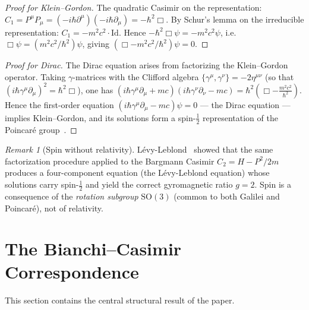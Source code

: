 \documentclass[12pt]{article}
\theoremstyle{plain}
\theoremstyle{definition}
\theoremstyle{remark}
\newtheorem{remark}[theorem]{Remark}
\newcommand{\SO}{\mathrm{SO}}
\begin{document}
\begin{proof}[Proof for Klein--Gordon]
The quadratic Casimir on the representation: $C_1 = P^\mu P_\mu = (-i\hbar\partial^\mu)(-i\hbar\partial_\mu) = -\hbar^2\Box$. By Schur's lemma on the irreducible representation: $C_1 = -m^2c^2 \cdot \mathrm{Id}$. Hence $-\hbar^2\Box\psi = -m^2c^2\psi$, i.e.\ $\Box\psi = (m^2c^2/\hbar^2)\psi$, giving $(\Box - m^2c^2/\hbar^2)\psi = 0$.
\end{proof}

\begin{proof}[Proof for Dirac]
The Dirac equation arises from factorizing the Klein--Gordon operator. Taking $\gamma$-matrices with the Clifford algebra $\{\gamma^\mu, \gamma^\nu\} = -2\eta^{\mu\nu}$ (so that $(i\hbar\gamma^\mu\partial_\mu)^2 = \hbar^2\Box$), one has $(i\hbar\gamma^\mu\partial_\mu + mc)(i\hbar\gamma^\nu\partial_\nu - mc) = \hbar^2\!\left(\Box - \tfrac{m^2c^2}{\hbar^2}\right)$. Hence the first-order equation $(i\hbar\gamma^\mu\partial_\mu - mc)\psi = 0$ --- the Dirac equation --- implies Klein--Gordon, and its solutions form a spin-$\frac{1}{2}$ representation of the Poincar\'e group~\cite{wigner1939,levyleblond1967}.
\end{proof}

\begin{remark}[Spin without relativity]
L\'evy-Leblond~\cite{levyleblond1967} showed that the same factorization procedure applied to the Bargmann Casimir $C_2 = H - P^2/2m$ produces a four-component equation (the L\'evy-Leblond equation) whose solutions carry spin-$\frac{1}{2}$ and yield the correct gyromagnetic ratio $g = 2$. Spin is a consequence of the \emph{rotation subgroup} $\SO(3)$ (common to both Galilei and Poincar\'e), not of relativity.
\end{remark}


\section{The Bianchi--Casimir Correspondence}
\label{sec:correspondence}

This section contains the central structural result of the paper.
\end{document}
